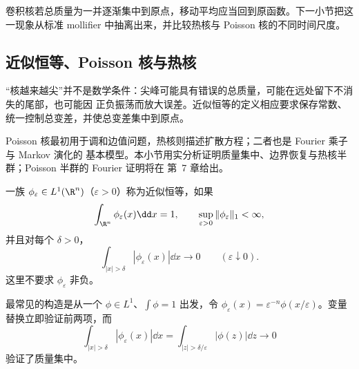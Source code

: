 卷积核若总质量为一并逐渐集中到原点，移动平均应当回到原函数。下一小节把这一现象从标准
mollifier 中抽离出来，并比较热核与 Poisson 核的不同时间尺度。


\subsection{近似恒等、Poisson 核与热核}\label{subsec:4-4-2}

“核越来越尖”并不是数学条件：尖峰可能具有错误的总质量，可能在远处留下不消失的尾部，也可能因
正负振荡而放大误差。近似恒等的定义相应要求保存常数、统一控制总变差，并使总变差集中到原点。

Poisson 核最初用于调和边值问题，热核则描述扩散方程；二者也是 Fourier 乘子与 Markov 演化的
基本模型。本小节用实分析证明质量集中、边界恢复与热核半群；Poisson 半群的 Fourier 证明将在
第~7 章给出。

\begin{definition}[近似恒等]\label{def:4-4-2-1}
一族 $\phi_\varepsilon\in L^1(\R^n)$（$\varepsilon>0$）称为近似恒等，如果
\[
 \int_{\R^n}\phi_\varepsilon(x)\dd x=1,
 \qquad \sup_{\varepsilon>0}\|\phi_\varepsilon\|_1<\infty,
\]
并且对每个 $\delta>0$，
\[
 \int_{|x|>\delta}|\phi_\varepsilon(x)|\dd x\longrightarrow0
 \qquad(\varepsilon\downarrow0).
\]
这里不要求 $\phi_\varepsilon$ 非负。
\end{definition}

最常见的构造是从一个 $\phi\in L^1$、$\int\phi=1$ 出发，令
$\phi_\varepsilon(x)=\varepsilon^{-n}\phi(x/\varepsilon)$。变量替换立即验证前两项，而
\[
 \int_{|x|>\delta}|\phi_\varepsilon(x)|\dd x
 =\int_{|z|>\delta/\varepsilon}|\phi(z)|\dd z\longrightarrow0
\]
验证了质量集中。

